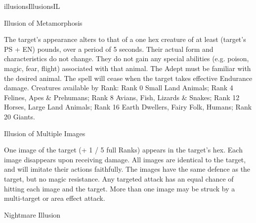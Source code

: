 \begin{College}[1.5]{illusions}{Illusions}{IL}
\begin{spell}[S-11]{Illusion of Metamorphosis}

\begin{effects}
The target’s appearance alters to that of a one hex creature of at
least (target’s PS + EN) pounds, over a period of 5 seconds.  Their
actual form and characteristics do not change.  They do not gain any
special abilities (e.g.  poison, magic, fear, flight) associated with
that animal. The Adept must be familiar with the desired animal. The
spell will cease when the target takes effective Endurance damage.
Creatures available by Rank: Rank 0 Small Land Animals; Rank 4
Felines, Apes \& Prehumans; Rank 8 Avians, Fish, Lizards \& Snakes;
Rank 12 Horses, Large Land Animals; Rank 16 Earth Dwellers, Fairy
Folk, Humans; Rank 20 Giants.
\end{effects}
\end{spell}

\begin{spell}[S-13]{Illusion of Multiple Images}

\begin{effects}
One image of the target (+ 1 / 5 full Ranks) appears in the target’s
hex. Each image disappears upon receiving damage. All images are
identical to the target, and will imitate their actions faithfully.
The images have the same defence as the target, but no magic
resistance. Any targeted attack has an equal chance of hitting each
image and the target.  More than one image may be struck by a
multi-target or area effect attack.
\end{effects}
\end{spell}

\begin{spell}[S-14]{Nightmare Illusion}


\end{spell}
\end{College}
